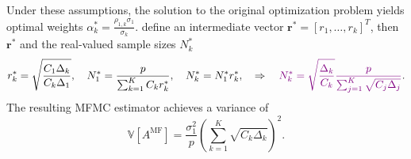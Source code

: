 \documentclass{beamer}
\newcommand{\JLcolor}[1]{{\textcolor{violet}{#1}}} %
\begin{document}
\begin{frame}[t]
{\begin{theorem}
        \vspace{-3mm}
        Under these assumptions, the solution to the original optimization problem  yields optimal weights $\alpha_k^*=\frac{\rho_{1,k}\sigma_1}{\sigma_k}$.
        define an intermediate vector $\boldsymbol{r}^* = [r_1,\ldots,r_k]^T$, then $\boldsymbol{r}^*$ and the real-valued sample sizes $N_k^*$
        \vspace{-3mm}
        \[
        r_k^* = \sqrt{\frac{C_1\Delta_k}{C_k\Delta_1}},\quad N_1^* = \frac{p}{\sum_{k=1}^K C_k r^*_k}, \quad N_k^*=N_1^*r_k^*,\quad \Rightarrow \quad \JLcolor{N_k^* = \sqrt{\frac{\Delta_k}{C_k}}\frac{p}{\sum_{j=1}^K \sqrt{C_j\Delta_j}}}.
        \] 
        \vspace{-3mm}
        The resulting MFMC estimator achieves a variance of
        \begin{equation*}
        \label{eq:MFMC_variance_optimal}
        \mathbb{V}\left[A^{\text{MF}}\right] =
        \frac{\sigma_1^2}{p}\left(\sum_{k=1}^K\sqrt{C_k\Delta_{k}}\right)^2.
        \end{equation*}
        \end{theorem}
        }

\end{frame}


\end{document}
